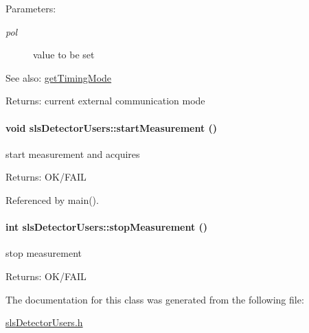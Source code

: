 \begin{Desc}
\item[Parameters:]
\begin{description}
\item[{\em pol}]value to be set\end{description}
\end{Desc}
\begin{Desc}
\item[See also:]\hyperlink{classslsDetectorUsers_420880726f4036bf9da83edfcb2d6cf0}{get\-Timing\-Mode} \end{Desc}
\begin{Desc}
\item[Returns:]current external communication mode \end{Desc}
\hypertarget{classslsDetectorUsers_a34810bb0e872fdf929ebe62d8582bd3}{
\paragraph[startMeasurement]{\setlength{\rightskip}{0pt plus 5cm}void sls\-Detector\-Users::start\-Measurement ()}\hfill}
\label{classslsDetectorUsers_a34810bb0e872fdf929ebe62d8582bd3}


start measurement and acquires 

\begin{Desc}
\item[Returns:]OK/FAIL \end{Desc}


Referenced by main().\hypertarget{classslsDetectorUsers_2abc673c45c1fe006f6b0fea6188e3a9}{
\paragraph[stopMeasurement]{\setlength{\rightskip}{0pt plus 5cm}int sls\-Detector\-Users::stop\-Measurement ()}\hfill}
\label{classslsDetectorUsers_2abc673c45c1fe006f6b0fea6188e3a9}


stop measurement 

\begin{Desc}
\item[Returns:]OK/FAIL \end{Desc}


The documentation for this class was generated from the following file:\begin{CompactItemize}
\item 
\hyperlink{slsDetectorUsers_8h}{sls\-Detector\-Users.h}\end{CompactItemize}
